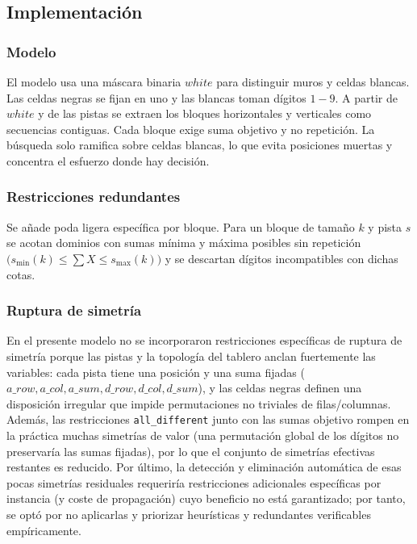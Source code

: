 
\subsection{Implementación}\label{sec:02-kakuro-implementacion}

\subsubsection*{Modelo}
El modelo usa una máscara binaria \(white\) para distinguir muros y celdas blancas. Las celdas negras se fijan en uno y las blancas toman dígitos \(1\!-\!9\). A partir de \(white\) y de las pistas se extraen los bloques horizontales y verticales como secuencias contiguas. Cada bloque exige suma objetivo y no repetición. La búsqueda solo ramifica sobre celdas blancas, lo que evita posiciones muertas y concentra el esfuerzo donde hay decisión.

\subsubsection*{Restricciones redundantes}
Se añade poda ligera específica por bloque. Para un bloque de tamaño \(k\) y pista \(s\) se acotan dominios con sumas mínima y máxima posibles sin repetición \(\big(s_{\min}(k)\le \sum X \le s_{\max}(k)\big)\) y se descartan dígitos incompatibles con dichas cotas.

\subsubsection*{Ruptura de simetría}
En el presente modelo no se incorporaron restricciones específicas de ruptura de simetría porque las pistas y la topología del tablero anclan fuertemente las variables: cada pista tiene una posición y una suma fijadas (\(a\_row,a\_col,a\_sum,d\_row,d\_col,d\_sum\)), y las celdas negras definen una disposición irregular que impide permutaciones no triviales de filas/columnas. Además, las restricciones \texttt{all\_different} junto con las sumas objetivo rompen en la práctica muchas simetrías de valor (una permutación global de los dígitos no preservaría las sumas fijadas), por lo que el conjunto de simetrías efectivas restantes es reducido. Por último, la detección y eliminación automática de esas pocas simetrías residuales requeriría restricciones adicionales específicas por instancia (y coste de propagación) cuyo beneficio no está garantizado; por tanto, se optó por no aplicarlas y priorizar heurísticas y redundantes verificables empíricamente.

